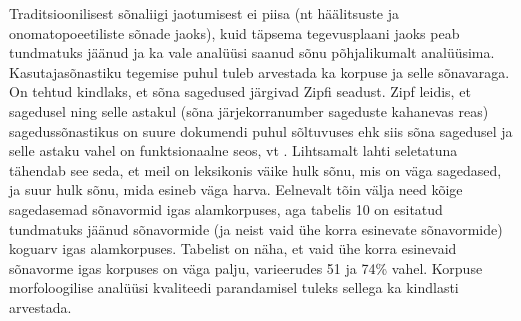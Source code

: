 \documentclass[12pt]{article}
\begin{document}
Traditsioonilisest sõnaliigi jaotumisest ei piisa (nt häälitsuste ja onomatopoeetiliste sõnade jaoks), kuid täpsema tegevusplaani jaoks peab tundmatuks jäänud ja ka vale analüüsi saanud sõnu põhjalikumalt analüüsima. Kasutajasõnastiku tegemise puhul tuleb arvestada ka korpuse ja selle sõnavaraga. On tehtud kindlaks, et sõna sagedused järgivad Zipfi seadust. Zipf leidis, et sagedusel ning selle astakul (sõna järjekorranumber sageduste kahanevas reas) sagedussõnastikus on suure dokumendi puhul sõltuvuses ehk siis sõna sagedusel ja selle astaku vahel on funktsionaalne seos, vt \citep[ptk 1]{Baayen}. Lihtsamalt lahti seletatuna tähendab see seda, et meil on leksikonis väike hulk sõnu, mis on väga sagedased, ja suur hulk sõnu, mida esineb väga harva. Eelnevalt tõin välja need kõige sagedasemad sõnavormid igas alamkorpuses, aga tabelis 10 on esitatud tundmatuks jäänud sõnavormide (ja neist vaid ühe korra esinevate sõnavormide) koguarv igas alamkorpuses. Tabelist on näha, et vaid ühe korra esinevaid sõnavorme igas korpuses on väga palju, varieerudes 51 ja 74\% vahel. Korpuse morfoloogilise analüüsi kvaliteedi parandamisel tuleks sellega ka kindlasti arvestada.
\end{document}

